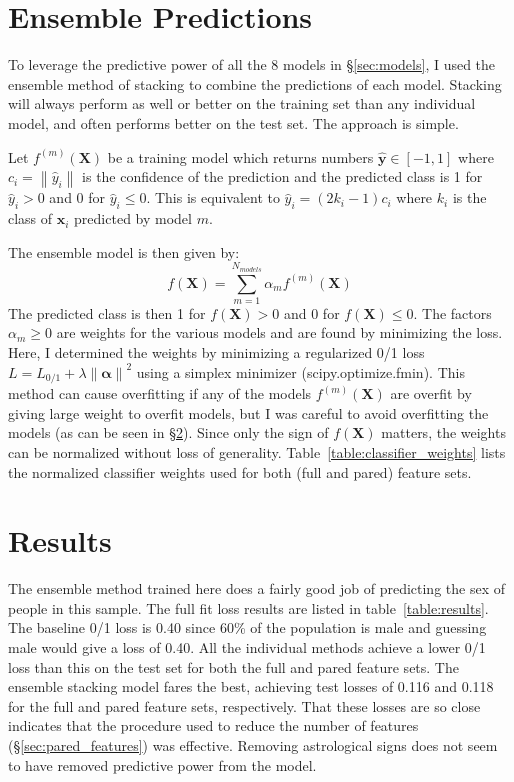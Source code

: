 \documentclass{article} %
\newcommand{\norm}[1]{\left\lVert#1\right\rVert}
\newcommand{\vect}[1]{\mathbf{#1}}
\newcommand{\mat}[1]{\mathbf{#1}}
\begin{document}
\section{Ensemble Predictions}
\label{sec:ensemble}
To leverage the predictive power of all the 8 models in \S\ref{sec:models}, I used the ensemble method of stacking to combine the predictions of each model.  Stacking will always perform as well or better on the training set than any individual model, and often performs better on the test set.  The approach is simple.  

Let $f^{(m)} (\mat{X})$ be a training model which returns numbers $\hat{\vect{y}} \in [-1, 1]$ where $c_i = \norm{\hat{y}_i}$ is the confidence of the prediction and the predicted class is 1 for $\hat{y}_i > 0$ and 0 for $\hat{y}_i \leq 0$.  This is equivalent to $\hat{y}_i = (2 k_i - 1) c_i$ where $k_i$ is the class of $\vect{x}_i$ predicted by model $m$.

The ensemble model is then given by:
\begin{equation}
\label{eq:ensemble_model}
f(\mat{X}) = \sum_{m=1}^{N_{models}}\alpha_m f^{(m)} (\mat{X})
\end{equation}
The predicted class is then 1 for $f(\mat{X}) > 0$ and 0 for $f(\mat{X}) \leq 0$.  The factors $\alpha_m \geq 0$ are weights for the various models and are found by minimizing the loss. Here, I determined the weights by minimizing a regularized 0/1 loss $L = L_{0/1} + \lambda\norm{\vect{\alpha}}^2$ using a simplex minimizer (scipy.optimize.fmin).  This method can cause overfitting if any of the models $f^{(m)} (\mat{X})$ are overfit by giving large weight to overfit models, but I was careful to avoid overfitting the models (as can be seen in \S\ref{sec:results}).  Since only the sign of $f(\mat{X})$ matters, the weights can be normalized without loss of generality.  Table~\ref{table:classifier_weights} lists the normalized classifier weights used for both (full and pared) feature sets.

\section{Results}
\label{sec:results}

The ensemble method trained here does a fairly good job of predicting the sex of people in this sample.  The full fit loss results are listed in table~\ref{table:results}. The baseline 0/1 loss is 0.40 since 60\% of the population is male and guessing male would give a loss of 0.40.  All the individual methods achieve a lower 0/1 loss than this on the test set for both the full and pared feature sets.  The ensemble stacking model fares the best, achieving test losses of 0.116 and 0.118 for the full and pared feature sets, respectively.  That these losses are so close indicates that the procedure used to reduce the number of features (\S\ref{sec:pared_features}) was effective.  Removing astrological signs does not seem to have removed predictive power from the model. 
\end{document}
